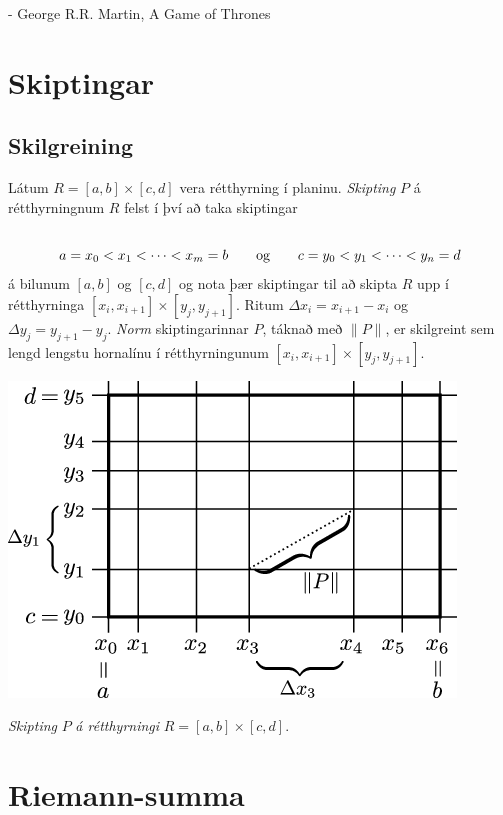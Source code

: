 \documentclass[a4paper,10pt,icelandic]{sphinxmanual}
\begin{document}
- George R.R. Martin, A Game of Thrones


\section{Skiptingar}
\label{Kafli4:skiptingar}\label{Kafli4:index-0}

\subsection{Skilgreining}
\label{Kafli4:skilgreining}
Látum \(R=[a,b]\times[c,d]\) vera rétthyrning í planinu. \emph{Skipting}
\(P\) á rétthyrningnum \(R\) felst í því að taka skiptingar
\begin{gather}
\begin{split}\displaystyle\end{split}\notag\\\begin{split}a=x_0<x_1<\cdots<x_m=b\qquad\mbox{og}\qquad
c=y_0<y_1<\cdots<y_n=d\end{split}\notag
\end{gather}
á bilunum \([a,b]\) og \([c,d]\) og nota þær skiptingar til að
skipta \(R\) upp í rétthyrninga
\([x_i,x_{i+1}]\times [y_j,y_{j+1}]\). Ritum
\(\Delta x_i=x_{i+1}-x_i\) og \(\Delta y_j=y_{j+1}-y_j\). \emph{Norm}
skiptingarinnar \(P\), táknað með \(\|P\|\), er skilgreint sem
lengd lengstu hornalínu í rétthyrningunum
\([x_i,x_{i+1}]\times [y_j,y_{j+1}]\).

{\hfill\includegraphics[width=0.500\linewidth]{skipting.png}\hfill}

\emph{Skipting} \(P\) \emph{á rétthyrningi} \(R= [a,b]\times [c,d]\).


\section{Riemann-summa}
\label{Kafli4:riemann-summa}\label{Kafli4:index-1}
\end{document}
